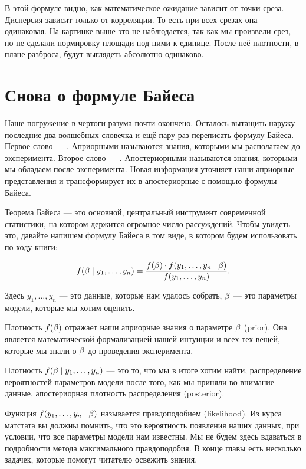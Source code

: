 В этой формуле видно, как математическое ожидание зависит от точки среза. Дисперсия зависит только от корреляции. То есть при всех срезах она одинаковая. На картинке выше это не наблюдается, так как мы произвели срез, но не сделали нормировку площади под ними к единице. После неё плотности, в плане разброса, будут выглядеть абсолютно одинаково. 


\section{Снова о формуле Байеса}

Наше погружение в чертоги разума почти окончено. Осталось вытащить наружу последние два волшебных словечка и ещё пару раз переписать формулу Байеса.  Первое слово --- . Априорными называются знания, которыми мы располагаем до эксперимента. Второе слово --- . Апостериорными называются знания, которыми мы обладаем после эксперимента. Новая информация уточняет наши априорные представления и трансформирует их в апостериорные с помощью формулы Байеса.

Теорема Байеса --- это основной, центральный инструмент современной статистики, на котором держится огромное число рассуждений. Чтобы увидеть это, давайте напишем формулу Байеса в том виде, в котором будем использовать по ходу книги: 

\[ 
f(\beta \mid y_1, \ldots, y_n) = \frac{f(\beta) \cdot f(y_1, \ldots, y_n \mid \beta)}{f(y_1, \ldots, y_n)}.
\]

Здесь $y_1, \ldots, y_n$ --- это данные, которые нам удалось собрать, $\beta$ --- это параметры модели, которые мы хотим оценить.   

Плотность $f(\beta)$ отражает наши априорные знания о параметре $\beta$ (prior).  Она является математической формализацией нашей интуиции и всех тех вещей, которые мы знали о $\beta$ до проведения эксперимента. 

Плотность $f(\beta \mid y_1, \ldots, y_n) $ --- это то, что мы в итоге хотим найти, распределение вероятностей параметров модели после того, как мы приняли во внимание данные, апостериорная плотность распределения (posterior).  

 Функция $f(y_1, \ldots, y_n \mid \beta )$ называется правдоподобием (likelihood). Из курса матстата вы должны помнить, что это вероятность появления наших данных, при условии, что все параметры модели нам известны. Мы не будем здесь вдаваться в подробности метода максимального правдоподобия. В конце главы есть несколько задачек, которые помогут читателю освежить знания. 
 
